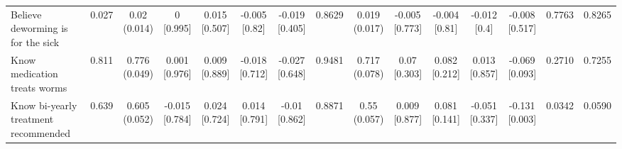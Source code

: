 \documentclass[
]{article}
\begin{document}
\begin{table}
{\begin{tabular}[t]{lcccccccccccccc}
\hspace{1em}Believe deworming is for the sick & 0.027 & \makecell[c]{0.02\\(0.014)} & \makecell[c]{0\\{[0.995]}} & \makecell[c]{0.015\\{[0.507]}} & \makecell[c]{-0.005\\{[0.82]}} & \makecell[c]{-0.019\\{[0.405]}} & 0.8629 & \makecell[c]{0.019\\(0.017)} & \makecell[c]{-0.005\\{[0.773]}} & \makecell[c]{-0.004\\{[0.81]}} & \makecell[c]{-0.012\\{[0.4]}} & \makecell[c]{-0.008\\{[0.517]}} & 0.7763 & 0.8265\\
\hspace{1em}Know medication treats worms & 0.811 & \makecell[c]{0.776\\(0.049)} & \makecell[c]{0.001\\{[0.976]}} & \makecell[c]{0.009\\{[0.889]}} & \makecell[c]{-0.018\\{[0.712]}} & \makecell[c]{-0.027\\{[0.648]}} & 0.9481 & \makecell[c]{0.717\\(0.078)} & \makecell[c]{0.07\\{[0.303]}} & \makecell[c]{0.082\\{[0.212]}} & \makecell[c]{0.013\\{[0.857]}} & \makecell[c]{-0.069\\{[0.093]}} & 0.2710 & 0.7255\\
\hspace{1em}Know bi-yearly treatment recommended & 0.639 & \makecell[c]{0.605\\(0.052)} & \makecell[c]{-0.015\\{[0.784]}} & \makecell[c]{0.024\\{[0.724]}} & \makecell[c]{0.014\\{[0.791]}} & \makecell[c]{-0.01\\{[0.862]}} & 0.8871 & \makecell[c]{0.55\\(0.057)} & \makecell[c]{0.009\\{[0.877]}} & \makecell[c]{0.081\\{[0.141]}} & \makecell[c]{-0.051\\{[0.337]}} & \makecell[c]{-0.131\\{[0.003]}} & 0.0342 & 0.0590\\

\end{tabular}}
\end{table}
\end{document}
